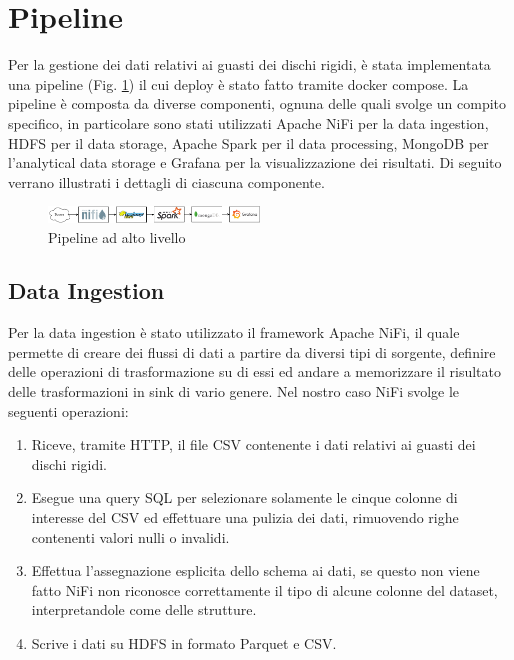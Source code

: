 \documentclass[conference]{IEEEtran}
\begin{document}
\section{Pipeline}
Per la gestione dei dati relativi ai guasti dei dischi rigidi, è stata implementata una pipeline (Fig. \ref{fig:pipeline}) il cui deploy è stato fatto tramite docker compose. La pipeline è composta da diverse componenti, ognuna delle quali svolge un compito specifico, in particolare sono stati utilizzati Apache NiFi per la data ingestion, HDFS per il data storage, Apache Spark per il data processing, MongoDB per l'analytical data storage e Grafana per la visualizzazione dei risultati. Di seguito verrano illustrati i dettagli di ciascuna componente.
\begin{figure}[H]
    \centering
    \includegraphics[width=0.5\textwidth]{./res/pipeline.png}
    \caption{Pipeline ad alto livello}
    \label{fig:pipeline}
\end{figure} 
\subsection{Data Ingestion}
Per la data ingestion è stato utilizzato il framework Apache NiFi, il quale permette di creare dei flussi di dati a partire da diversi tipi di sorgente, definire delle operazioni di trasformazione su di essi ed andare a memorizzare il risultato delle trasformazioni in sink di vario genere. Nel nostro caso NiFi svolge le seguenti operazioni:
\begin{enumerate}
    \item Riceve, tramite HTTP, il file CSV contenente i dati relativi ai guasti dei dischi rigidi.
    \item Esegue una query SQL %
    per selezionare solamente le cinque colonne di interesse del CSV ed effettuare una pulizia dei dati, rimuovendo righe contenenti valori nulli o invalidi. 
    \item Effettua l'assegnazione esplicita dello schema ai dati, se questo non viene fatto NiFi non riconosce correttamente il tipo di alcune colonne del dataset, interpretandole come delle strutture.
    \item Scrive i dati su HDFS in formato Parquet e CSV.
\end{enumerate}
\end{document}
